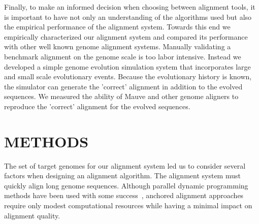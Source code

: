 \documentclass[titlepage,11pt]{article}
\begin{document}

Finally, to make an informed decision when choosing between alignment tools, it
is important to have not only an understanding of the algorithms used but also
the empirical performance of the alignment system.  Towards this end we
empirically characterized our alignment system and compared its performance
with other well known genome alignment systems.  
Manually validating a benchmark alignment on the genome scale is too labor
intensive.  Instead we developed a simple
genome evolution simulation system that incorporates large and small scale
evolutionary events.  Because the evolutionary history is known, the simulator
can generate the 'correct' alignment in addition to the evolved sequences.  We
measured the ability of Mauve and other genome aligners to reproduce the
'correct' alignment for the evolved sequences.



\section*{ METHODS }



The set of target genomes for our alignment system led us to consider several
factors when designing an alignment algorithm.  The alignment system must
quickly align long genome sequences.  Although parallel dynamic programming
methods have been used with some success~\citep{paralleldp}, anchored
alignment approaches require only modest computational resources while having
a minimal impact on alignment quality.
\end{document}

